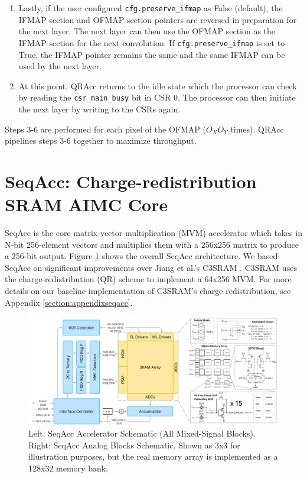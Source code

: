 \begin{enumerate}
    \item Lastly, if the user configured \lstinline{cfg.preserve_ifmap} as False (default), the IFMAP section and OFMAP section pointers are reversed in preparation for the next layer. The next layer can then use the OFMAP section as the IFMAP section for the next convolution. If \lstinline{cfg.preserve_ifmap} is set to True, the IFMAP pointer remains the same and the same IFMAP can be used by the next layer.
    \item At this point, QRAcc returns to the idle state which the processor can check by reading the \lstinline{csr_main_busy} bit in CSR 0. The processor can then initiate the next layer by writing to the CSRs again. 
\end{enumerate}  

Steps 3-6 are performed for each pixel of the OFMAP ($O_XO_Y$ times). QRAcc pipelines steps 3-6 together to maximize throughput.

\section{SeqAcc: Charge-redistribution SRAM AIMC Core}

SeqAcc is the core matrix-vector-multiplication (MVM) accelerator which takes in N-bit 256-element vectors and multiplies them with a 256x256 matrix to produce a 256-bit output. Figure \ref{fig:imc_qrAccSchem} shows the overall SeqAcc architecture. We based SeqAcc on significant improvements over Jiang et al.'s C3SRAM \cite{jiang2020c3sram}. C3SRAM uses the charge-redistribution (QR) scheme to implement a 64x256 MVM. For more details on our baseline implementation of C3SRAM's charge redistribution, see Appendix \ref{section:appendixseqacc}.

\begin{figure}[h]
    \centering
    \includegraphics[width=\linewidth]{images/qracc/imc_seqacc.png}
    \caption{Left: SeqAcc Accelerator Schematic (All Mixed-Signal Blocks). Right: SeqAcc Analog Blocks Schematic. Shown as 3x3 for illustration purposes, but the real memory array is implemented as a 128x32 memory bank.}
    \label{fig:imc_qrAccSchem}
\end{figure}

